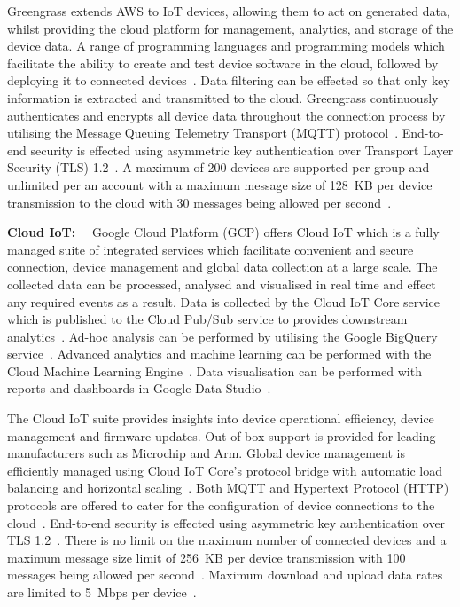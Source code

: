 \documentclass[10pt,twocolumn]{witseiepaper}
\begin{document}
				Greengrass extends AWS to IoT devices, allowing them to act on generated data, whilst providing the cloud platform for management, analytics, and storage of the device data. A range of programming languages and programming models which facilitate the ability to create and test device software in the cloud, followed by deploying it to connected devices~\cite{greengrass}. Data filtering can be effected so that only key information is extracted and transmitted to the cloud. Greengrass continuously authenticates and encrypts all device data throughout the connection process by utilising the Message Queuing Telemetry Transport (MQTT) protocol~\cite{greengrass}. End-to-end security is effected using asymmetric key authentication over Transport Layer Security (TLS) 1.2~\cite{greengrass}. A maximum of 200 devices are supported per group and unlimited per an account with a maximum message size of 128~KB per device transmission to the cloud with 30 messages being allowed per second~\cite{aws-quota}.
				
				\textbf{Cloud IoT:}~~
				Google Cloud Platform (GCP) offers Cloud IoT which is a fully managed suite of integrated services which facilitate convenient and secure connection, device management and global data collection at a large scale. The collected data can be processed, analysed and visualised in real time and effect any required events as a result. Data is collected by the Cloud IoT Core service which is published to the Cloud Pub/Sub service to provides downstream analytics~\cite{cloud-iot}. Ad-hoc analysis can be performed by utilising the Google BigQuery service~\cite{cloud-iot}. Advanced analytics and machine learning can be performed with the Cloud Machine Learning Engine~\cite{cloud-iot}. Data visualisation can be performed with reports and dashboards in Google Data Studio~\cite{cloud-iot}.
				
				The Cloud IoT suite provides insights into device operational efficiency, device management and firmware updates. Out-of-box support is provided for leading manufacturers such as Microchip and Arm. Global device management is efficiently managed using Cloud IoT Core's protocol bridge with automatic load balancing and horizontal scaling~\cite{cloud-iot}. Both MQTT and Hypertext Protocol (HTTP) protocols are offered to cater for the configuration of device connections to the cloud~\cite{gcp-security}. End-to-end security is effected using asymmetric key authentication over TLS 1.2~\cite{gcp-security}. There is no limit on the maximum number of connected devices and a maximum message size limit of 256~KB per device transmission with 100 messages being allowed per second~\cite{gcp-quota}. Maximum download and upload data rates are limited to 5~Mbps per device~\cite{gcp-quota}.
			
\end{document}
